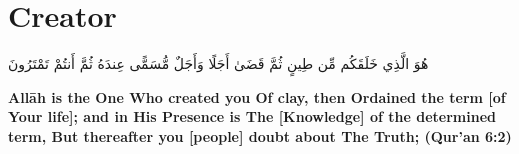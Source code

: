\chapter{Creator}
\begin{center}
    {\Huge    
        \begin{Arabic}
            هُوَ الَّذِي خَلَقَكُم مِّن طِينٍ ثُمَّ قَضَىٰ أَجَلًا وَأَجَلٌ مُّسَمًّى عِندَهُ ثُمَّ أَنتُمْ تَمْتَرُونَ
        \end{Arabic}
    }    
\end{center}
\vspace*{\fill}
\vspace{3cm}
\begin{center}
    \large \textbf{Allāh is the One Who created you Of clay, then Ordained the term [of Your life]; and in His Presence is The [Knowledge] of the determined term, But thereafter you [people] doubt about The Truth; (Qur'an 6:2)}
\end{center}
